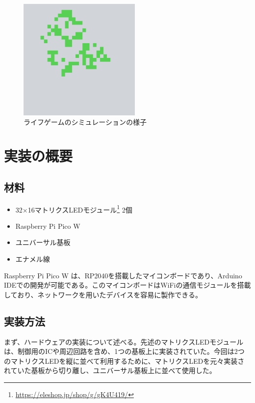 \documentclass{jlreq}
\begin{document}
\begin{figure}[h]
    \begin{center}
        \includegraphics[width=60mm]{img/lifegame.png}
    \end{center}
    \caption{ライフゲームのシミュレーションの様子}
    \label{img:lifegame}
\end{figure}

\section{実装の概要}
\subsection{材料}
\begin{itemize}
    \item 32×16マトリクスLEDモジュール\footnote{\url{https://eleshop.jp/shop/g/gK4U419/}} 2個
    \item Raspberry Pi Pico W
    \item ユニバーサル基板
    \item エナメル線
\end{itemize}
Raspberry Pi Pico W は、RP2040を搭載したマイコンボードであり、Arduino IDEでの開発が可能である。このマイコンボードはWiFiの通信モジュールを搭載しており、ネットワークを用いたデバイスを容易に製作できる。

\subsection{実装方法}
まず、ハードウェアの実装について述べる。先述のマトリクスLEDモジュールは、制御用のICや周辺回路を含め、1つの基板上に実装されていた。今回は2つのマトリクスLEDを縦に並べて利用するために、マトリクスLEDを元々実装されていた基板から切り離し、ユニバーサル基板上に並べて使用した。
\end{document}
